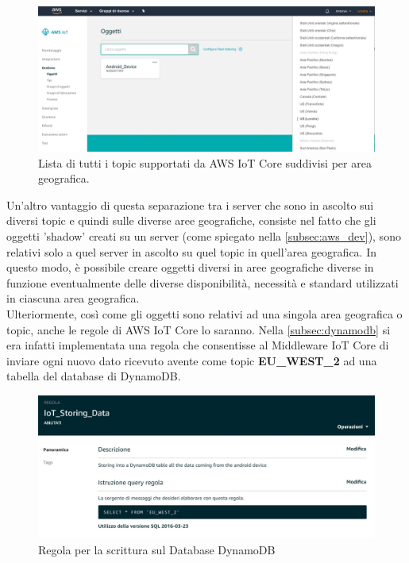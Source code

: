 \begin{figure}
	\begin{center}
		\includegraphics[width=0.9\columnwidth]{images/aws_1}
	\end{center}
	\caption{Lista di tutti i topic supportati da AWS IoT Core suddivisi per area geografica.}
	\label{fig:aws_1}
\end{figure}
Un'altro vantaggio di questa separazione tra i server che sono in ascolto sui diversi topic e quindi sulle diverse aree geografiche, consiste nel fatto che gli oggetti 'shadow' creati su un server (come spiegato nella \autoref{subsec:aws_dev}), sono relativi solo a quel server in ascolto su quel topic in quell'area geografica. In questo modo, è possibile creare oggetti diversi in aree geografiche diverse in funzione eventualmente delle diverse disponibilità, necessità e standard utilizzati in ciascuna area geografica.\\
Ulteriormente, così come gli oggetti sono relativi ad una singola area geografica o topic, anche le regole di AWS IoT Core lo saranno. Nella \autoref{subsec:dynamodb} si era infatti implementata una regola che consentisse al Middleware IoT Core di inviare ogni nuovo dato ricevuto avente come topic \textbf{EU\_WEST\_2} ad una tabella del database di DynamoDB.
\begin{figure}
	\begin{center}
		\includegraphics[width=0.7\columnwidth]{images/dynamodb_3}
	\end{center}
	\caption{Regola per la scrittura sul Database DynamoDB}
	\label{fig:dynamodb_31}
\end{figure}
